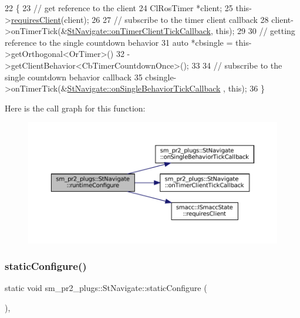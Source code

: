\begin{DoxyCode}
22     \{
23         \textcolor{comment}{// get reference to the client}
24         ClRosTimer *client;
25         this->\hyperlink{classsmacc_1_1ISmaccState_a7f95c9f0a6ea2d6f18d1aec0519de4ac}{requiresClient}(client);
26 
27         \textcolor{comment}{// subscribe to the timer client callback}
28         client->onTimerTick(&\hyperlink{structsm__pr2__plugs_1_1StNavigate_a6340d786397971eff5772816cdf7affc}{StNavigate::onTimerClientTickCallback}, \textcolor{keyword}{
      this});
29 
30         \textcolor{comment}{// getting reference to the single countdown behavior}
31         \textcolor{keyword}{auto} *cbsingle = this->getOrthogonal<OrTimer>()
32                              ->getClientBehavior<CbTimerCountdownOnce>();
33 
34         \textcolor{comment}{// subscribe to the single countdown behavior callback}
35         cbsingle->onTimerTick(&\hyperlink{structsm__pr2__plugs_1_1StNavigate_a0e58e927f01a817040c13987ecd4695f}{StNavigate::onSingleBehaviorTickCallback}
      , \textcolor{keyword}{this});
36     \}
\end{DoxyCode}
Here is the call graph for this function\+:
\nopagebreak
\begin{figure}[H]
\begin{center}
\leavevmode
\includegraphics[width=350pt]{structsm__pr2__plugs_1_1StNavigate_ae7ab6b7fda6772eb50c512da21085cc0_cgraph}
\end{center}
\end{figure}
\mbox{\label{structsm__pr2__plugs_1_1StNavigate_a052e5c763e3e8d487f3dcaa2a9a2fab0}} 
\subsubsection{\texorpdfstring{static\+Configure()}{staticConfigure()}}
{\footnotesize\ttfamily static void sm\+\_\+pr2\+\_\+plugs\+::\+St\+Navigate\+::static\+Configure (\begin{DoxyParamCaption}{ }\end{DoxyParamCaption})\hspace{0.3cm}{\ttfamily [inline]}, {\ttfamily [static]}}



